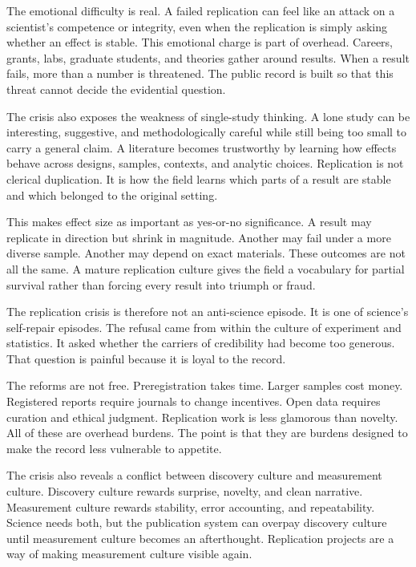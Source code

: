 The emotional difficulty is real. A failed replication can feel like an attack
on a scientist's competence or integrity, even when the replication is simply
asking whether an effect is stable. This emotional charge is part of overhead.
Careers, grants, labs, graduate students, and theories gather around results.
When a result fails, more than a number is threatened. The public record is
built so that this threat cannot decide the evidential question.

The crisis also exposes the weakness of single-study thinking. A lone study
can be interesting, suggestive, and methodologically careful while still being
too small to carry a general claim. A literature becomes trustworthy by
learning how effects behave across designs, samples, contexts, and analytic
choices. Replication is not clerical duplication. It is how the field learns
which parts of a result are stable and which belonged to the original setting.

This makes effect size as important as yes-or-no significance. A result may
replicate in direction but shrink in magnitude. Another may fail under a more
diverse sample. Another may depend on exact materials. These outcomes are not
all the same. A mature replication culture gives the field a vocabulary for
partial survival rather than forcing every result into triumph or fraud.

The replication crisis is therefore not an anti-science episode. It is one of
science's self-repair episodes. The refusal came from within the culture of
experiment and statistics. It asked whether the carriers of credibility had
become too generous. That question is painful because it is loyal to the
record.

The reforms are not free. Preregistration takes time. Larger samples cost
money. Registered reports require journals to change incentives. Open data
requires curation and ethical judgment. Replication work is less glamorous
than novelty. All of these are overhead burdens. The point is that they are
burdens designed to make the record less vulnerable to appetite.

The crisis also reveals a conflict between discovery culture and measurement
culture. Discovery culture rewards surprise, novelty, and clean narrative.
Measurement culture rewards stability, error accounting, and repeatability.
Science needs both, but the publication system can overpay discovery culture
until measurement culture becomes an afterthought. Replication projects are a
way of making measurement culture visible again.

